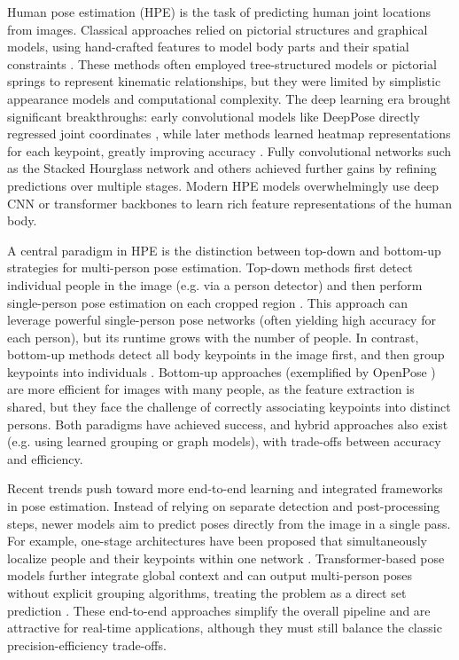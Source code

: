 Human pose estimation (HPE) is the task of predicting human joint locations from images. Classical approaches relied on pictorial structures and graphical models, using hand-crafted features to model body parts and their spatial constraints \citep{Felzenszwalb2005}. These methods often employed tree-structured models or pictorial springs to represent kinematic relationships, but they were limited by simplistic appearance models and computational complexity. The deep learning era brought significant breakthroughs: early convolutional models like DeepPose directly regressed joint coordinates \citep{Toshev2014}, while later methods learned heatmap representations for each keypoint, greatly improving accuracy \citep{Tompson2015}. Fully convolutional networks such as the Stacked Hourglass network \citep{Newell2016} and others achieved further gains by refining predictions over multiple stages. Modern HPE models overwhelmingly use deep CNN or transformer backbones to learn rich feature representations of the human body.

A central paradigm in HPE is the distinction between top-down and bottom-up strategies for multi-person pose estimation. Top-down methods first detect individual people in the image (e.g. via a person detector) and then perform single-person pose estimation on each cropped region \citep{He2017}. This approach can leverage powerful single-person pose networks (often yielding high accuracy for each person), but its runtime grows with the number of people. In contrast, bottom-up methods detect all body keypoints in the image first, and then group keypoints into individuals \citep{Cao2017}. Bottom-up approaches (exemplified by OpenPose \citep{Cao2017}) are more efficient for images with many people, as the feature extraction is shared, but they face the challenge of correctly associating keypoints into distinct persons. Both paradigms have achieved success, and hybrid approaches also exist (e.g. using learned grouping or graph models), with trade-offs between accuracy and efficiency.

Recent trends push toward more end-to-end learning and integrated frameworks in pose estimation. Instead of relying on separate detection and post-processing steps, newer models aim to predict poses directly from the image in a single pass. For example, one-stage architectures have been proposed that simultaneously localize people and their keypoints within one network \citep{Nie2019}. Transformer-based pose models further integrate global context and can output multi-person poses without explicit grouping algorithms, treating the problem as a direct set prediction \citep{Stoffl2021}. These end-to-end approaches simplify the overall pipeline and are attractive for real-time applications, although they must still balance the classic precision-efficiency trade-offs.
